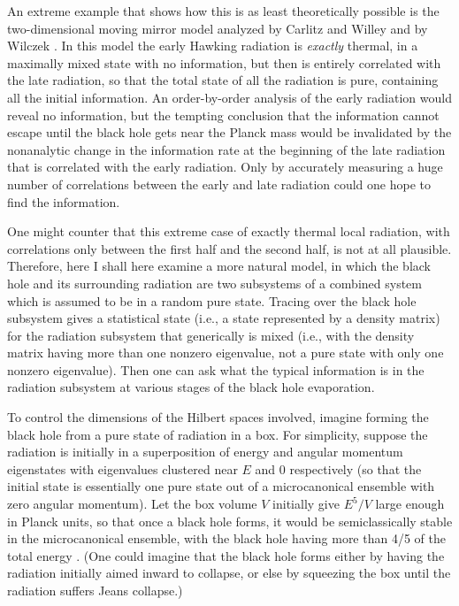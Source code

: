 \documentclass[12pt]{article}
\begin{document}
	An extreme example that shows how this is as least
theoretically
possible is the two-dimensional moving mirror model analyzed by
Carlitz and Willey and by Wilczek \cite{CW2}.  In this model
the early Hawking radiation is {\it exactly} thermal, in a maximally
mixed
state with no information, but then is entirely correlated with the
late
radiation, so that the total state of all the radiation is pure,
containing
all the initial information.  An order-by-order analysis of the early
radiation would reveal no information, but the tempting conclusion
that
the information cannot escape until the black hole gets near the
Planck
mass would be invalidated by the nonanalytic change in the
information
rate at the beginning of the late radiation that is correlated with
the
early radiation.  Only by accurately measuring a huge number of
correlations between the early and late radiation could one hope
to find the information.

	One might counter that this extreme case of exactly thermal
local
radiation, with correlations only between the first half and the
second
half, is not at all plausible.  Therefore, here I shall here examine
a more
natural model, in which the black hole and its surrounding radiation
are two subsystems of a combined system which is assumed to be in
a random pure state.  Tracing over the black hole subsystem gives a
statistical state (i.e., a state represented by a density matrix) for
the
radiation subsystem that generically is mixed (i.e., with the density
matrix having more than one nonzero eigenvalue, not a pure state
with only one nonzero eigenvalue).  Then one can ask what the typical
information is in the radiation subsystem at various stages of the
black
hole evaporation.

	To control the dimensions of the Hilbert spaces involved,
imagine
forming the black hole from a pure state of radiation in a box.  For
simplicity, suppose the radiation is initially in a superposition of
energy
and angular momentum eigenstates with eigenvalues clustered near
$E$ and 0 respectively (so that the initial state is essentially one
pure
state out of a microcanonical ensemble with zero angular momentum).
Let the box volume $V$ initially give $E^5/V$ large enough in Planck
units,
so that once a black hole forms, it would be semiclassically stable
in the
microcanonical ensemble, with the black hole having more than 4/5 of
the total energy
\cite{Haw76a}.  (One could imagine that the black hole forms
either by having the radiation initially aimed inward to collapse, or
else
by squeezing the box until the radiation suffers Jeans collapse.)
\end{document}
